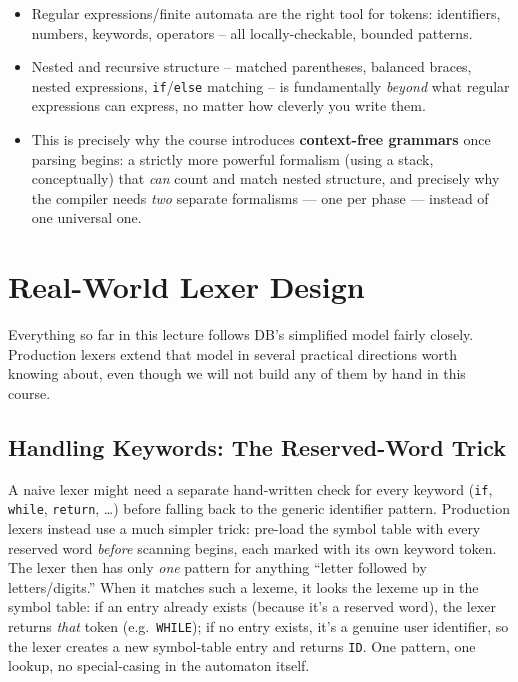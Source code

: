 \documentclass[full-course-notes.tex]{subfiles}
\begin{document}
\begin{takeaways}
\begin{itemize}
  \item Regular expressions/finite automata are the right tool for tokens: identifiers,
  numbers, keywords, operators -- all locally-checkable, bounded patterns.
  \item Nested and recursive structure -- matched parentheses, balanced braces, nested
  expressions, \texttt{if}/\texttt{else} matching -- is fundamentally \emph{beyond} what regular
  expressions can express, no matter how cleverly you write them.
  \item This is precisely why the course introduces \textbf{context-free grammars} once parsing
  begins: a strictly more powerful formalism (using a stack, conceptually) that \emph{can}
  count and match nested structure, and precisely why the compiler needs \emph{two} separate
  formalisms --- one per phase --- instead of one universal one.
\end{itemize}
\end{takeaways}

\section{Real-World Lexer Design}
\label{sec:l3-beyond-db}

\beyonddb Everything so far in this lecture follows DB's simplified model fairly closely.
Production lexers extend that model in several practical directions worth knowing about, even
though we will not build any of them by hand in this course.

\subsection{Handling Keywords: The Reserved-Word Trick}

A naive lexer might need a separate hand-written check for every keyword (\texttt{if},
\texttt{while}, \texttt{return}, \dots) before falling back to the generic identifier pattern.
Production lexers instead use a much simpler trick: pre-load the symbol table with every
reserved word \emph{before} scanning begins, each marked with its own keyword token. The lexer
then has only \emph{one} pattern for anything ``letter followed by letters/digits.'' When it
matches such a lexeme, it looks the lexeme up in the symbol table: if an entry already exists
(because it's a reserved word), the lexer returns \emph{that} token (e.g.\ \texttt{WHILE}); if
no entry exists, it's a genuine user identifier, so the lexer creates a new symbol-table entry
and returns \texttt{ID}. One pattern, one lookup, no special-casing in the automaton itself.
\end{document}
